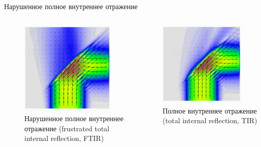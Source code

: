 \documentclass[9pt, compress, xcolor=table]{beamer}
\begin{document}
\begin{frame}{Нарушенное полное внутреннее отражение}

\begin{columns}[c]
\begin{column}[c]{6.5cm}
\begin{figure}
\centering\includegraphics[width=0.8\textwidth]{fig2_06a}\\
\scriptsize{Нарушенное полное внутреннее отражение (frustrated total internal reflection, FTIR)}
\end{figure}
\end{column}
\hfill
\begin{column}[c]{6.5cm}
\centering\includegraphics[width=0.8\textwidth]{fig2_06b}\\
\scriptsize{Полное внутреннее отражение (total internal reflection, TIR)}
\end{column}
\end{columns}


\end{frame}
\end{document}
